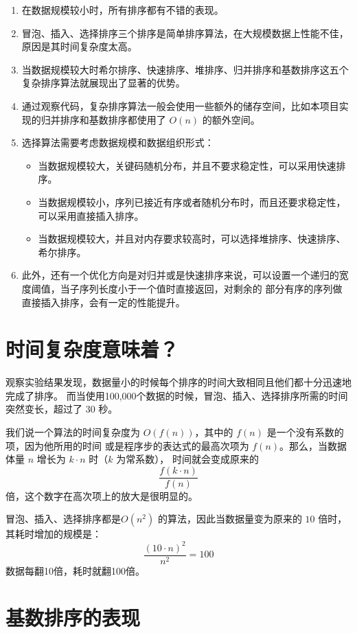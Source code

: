 \begin{enumerate}
    \item 在数据规模较小时，所有排序都有不错的表现。
    \item 冒泡、插入、选择排序三个排序是简单排序算法，在大规模数据上性能不佳，原因是其时间复杂度太高。
    \item 当数据规模较大时希尔排序、快速排序、堆排序、归并排序和基数排序这五个复杂排序算法就展现出了显著的优势。
    \item 通过观察代码，复杂排序算法一般会使用一些额外的储存空间，比如本项目实现的归并排序和基数排序都使用了 $O(n)$ 的额外空间。
    \item 选择算法需要考虑数据规模和数据组织形式：
    \begin{itemize}
        \item 当数据规模较大，关键码随机分布，并且不要求稳定性，可以采用快速排序。
        \item 当数据规模较小，序列已接近有序或者随机分布时，而且还要求稳定性，可以采用直接插入排序。
        \item 当数据规模较大，并且对内存要求较高时，可以选择堆排序、快速排序、希尔排序。
    \end{itemize}
    \item 此外，还有一个优化方向是对归并或是快速排序来说，可以设置一个递归的宽度阈值，当子序列长度小于一个值时直接返回，对剩余的%
        部分有序的序列做直接插入排序，会有一定的性能提升。
\end{enumerate}


\section{时间复杂度意味着？}

观察实验结果发现，数据量小的时候每个排序的时间大致相同且他们都十分迅速地完成了排序。%
而当使用100,000个数据的时候，冒泡、插入、选择排序所需的时间突然变长，超过了 30 秒。

我们说一个算法的时间复杂度为 $O(f(n))$，其中的 $f(n)$ 是一个没有系数的项，因为他所用的时间%
或是程序步的表达式的最高次项为 $f(n)$。那么，当数据体量 $n$ 增长为 $k \cdot n$ 时（$k$ 为常系数），%
时间就会变成原来的 $$\frac{f(k \cdot n)}{f(n)}$$ 倍，这个数字在高次项上的放大是很明显的。

冒泡、插入、选择排序都是$O(n^2)$ 的算法，因此当数据量变为原来的 $10$ 倍时，其耗时增加的规模是：%
$$\frac{(10 \cdot n)^2}{n^2} = 100$$数据每翻10倍，耗时就翻100倍。

\section{基数排序的表现}

